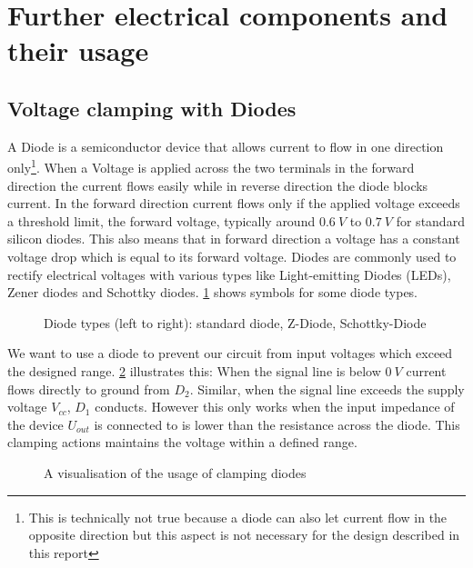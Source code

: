 \section{Further electrical components and their usage}

\subsection{Voltage clamping with Diodes}

A Diode is a semiconductor device that allows current to flow in one direction only\footnote{This is technically not true because a diode can also let current flow in the opposite direction but this aspect is not necessary for the design described in this report}. When a Voltage is applied across the two terminals in the forward direction the current flows easily while in reverse direction the diode blocks current. In the forward direction current flows only if the applied voltage exceeds a threshold limit, the forward voltage, typically around $\SI{0.6}{V}$ to $\SI{0.7}{V}$ for standard silicon diodes. This also means that in forward direction a voltage has a constant voltage drop which is equal to its forward voltage. Diodes are commonly used to rectify electrical voltages with various types like Light-emitting Diodes (LEDs), Zener diodes and Schottky diodes. \cref{fig:diode-types} shows symbols for some diode types.

\begin{figure}[htb]
	\centering
	\caption{Diode types (left to right): standard diode, Z-Diode, Schottky-Diode}
	\label{fig:diode-types}
\end{figure}

We want to use a diode to prevent our circuit from input voltages which exceed the designed range. \cref{fig:clamping-diodes} illustrates this: When the signal line is below $\SI{0}{V}$ current flows directly to ground from $D_2$. Similar, when the signal line exceeds the supply voltage $V_{cc}$, $D_1$ conducts. However this only works when the input impedance of the device $U_{out}$ is connected to is lower than the resistance across the diode. This clamping actions maintains the voltage within a defined range.

\begin{figure}[htb]
	\centering
	\caption{A visualisation of the usage of clamping diodes}
	\label{fig:clamping-diodes}
\end{figure}

